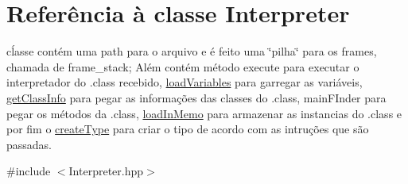 \hypertarget{class_interpreter}{}\section{Referência à classe Interpreter}
\label{class_interpreter}


cĺasse contém uma path para o arquivo e é feito uma \char`\"{}pilha\char`\"{} para os frames, chamada de frame\+\_\+stack; Além contém método execute para executar o interpretador do .class recebido, \hyperlink{class_interpreter_1_1load_variables}{load\+Variables} para garregar as variáveis, \hyperlink{class_interpreter_1_1get_class_info}{get\+Class\+Info} para pegar as informações das classes do .class, main\+F\+Inder para pegar os métodos da .class, \hyperlink{class_interpreter_1_1load_in_memo}{load\+In\+Memo} para armazenar as instancias do .class e por fim o \hyperlink{class_interpreter_1_1create_type}{create\+Type} para criar o tipo de acordo com as intruções que são passadas.  




{\ttfamily \#include $<$Interpreter.\+hpp$>$}

